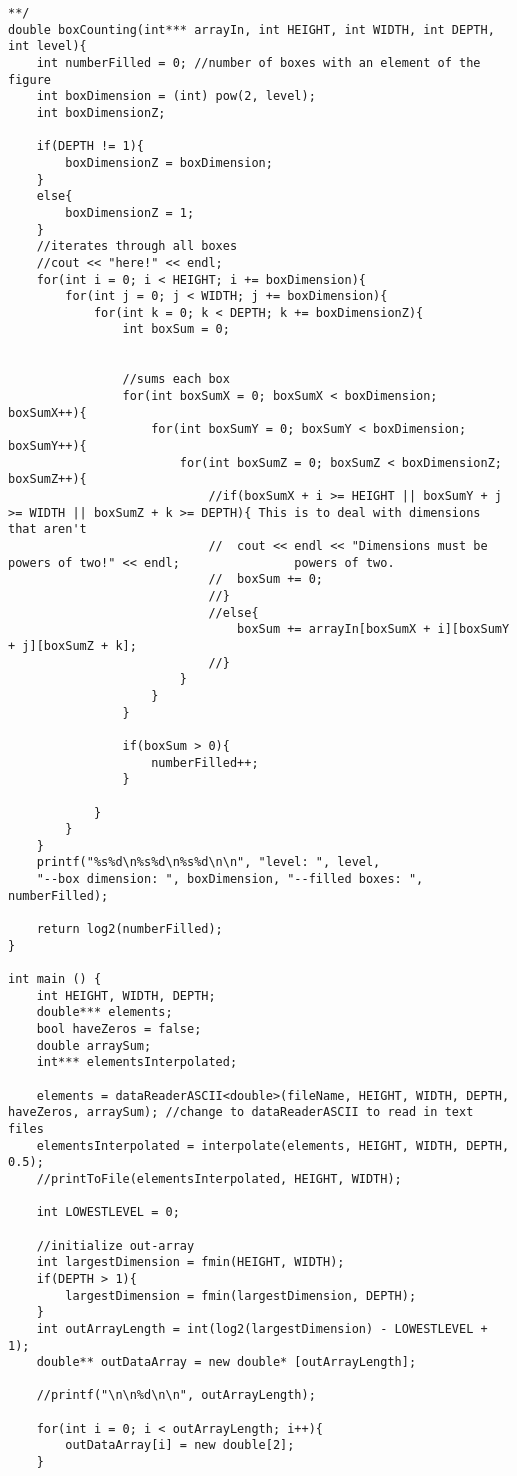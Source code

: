 \begin{lstlisting}
**/
double boxCounting(int*** arrayIn, int HEIGHT, int WIDTH, int DEPTH, int level){
	int numberFilled = 0; //number of boxes with an element of the figure
	int boxDimension = (int) pow(2, level);
	int boxDimensionZ;

	if(DEPTH != 1){
		boxDimensionZ = boxDimension;
	}
	else{
		boxDimensionZ = 1;
	}
	//iterates through all boxes
	//cout << "here!" << endl;
	for(int i = 0; i < HEIGHT; i += boxDimension){
		for(int j = 0; j < WIDTH; j += boxDimension){
			for(int k = 0; k < DEPTH; k += boxDimensionZ){
				int boxSum = 0;


				//sums each box
				for(int boxSumX = 0; boxSumX < boxDimension; boxSumX++){
					for(int boxSumY = 0; boxSumY < boxDimension; boxSumY++){
						for(int boxSumZ = 0; boxSumZ < boxDimensionZ; boxSumZ++){
							//if(boxSumX + i >= HEIGHT || boxSumY + j >= WIDTH || boxSumZ + k >= DEPTH){ This is to deal with dimensions that aren't
							//	cout << endl << "Dimensions must be powers of two!" << endl;				powers of two.
							//	boxSum += 0;
							//}
							//else{
								boxSum += arrayIn[boxSumX + i][boxSumY + j][boxSumZ + k];
							//}
						}
					}
				}

				if(boxSum > 0){
					numberFilled++;
				}

			}
		}
	}
	printf("%s%d\n%s%d\n%s%d\n\n", "level: ", level, 
	"--box dimension: ", boxDimension, "--filled boxes: ", numberFilled);		

	return log2(numberFilled);
}

int main () {
	int HEIGHT, WIDTH, DEPTH;
	double*** elements;
	bool haveZeros = false;
	double arraySum;
	int*** elementsInterpolated;

	elements = dataReaderASCII<double>(fileName, HEIGHT, WIDTH, DEPTH, haveZeros, arraySum); //change to dataReaderASCII to read in text files
	elementsInterpolated = interpolate(elements, HEIGHT, WIDTH, DEPTH, 0.5);
	//printToFile(elementsInterpolated, HEIGHT, WIDTH);

	int LOWESTLEVEL = 0;

	//initialize out-array
	int largestDimension = fmin(HEIGHT, WIDTH);
	if(DEPTH > 1){
		largestDimension = fmin(largestDimension, DEPTH);
	}
	int outArrayLength = int(log2(largestDimension) - LOWESTLEVEL + 1);
	double** outDataArray = new double* [outArrayLength];

	//printf("\n\n%d\n\n", outArrayLength);

	for(int i = 0; i < outArrayLength; i++){
		outDataArray[i] = new double[2];
	}


\end{lstlisting}
